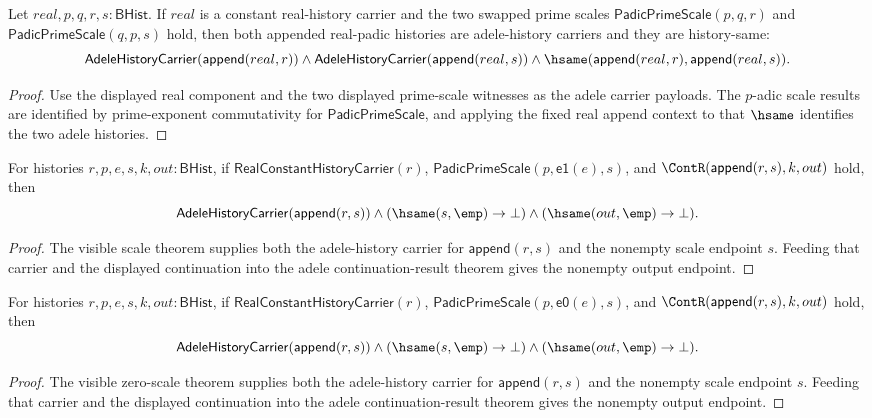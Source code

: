 \begin{theorem}
\label{thm:adele-prime-swap-scale-readback}
Let \(real,p,q,r,s:\mathsf{BHist}\). If \(real\) is a constant real-history
carrier and the two swapped prime scales
\(\mathsf{PadicPrimeScale}(p,q,r)\) and \(\mathsf{PadicPrimeScale}(q,p,s)\)
hold, then both appended real-padic histories are adele-history carriers and
they are history-same:
$$
\mathsf{AdeleHistoryCarrier}(\mathsf{append}(real,r))\land
\mathsf{AdeleHistoryCarrier}(\mathsf{append}(real,s))\land
\hsame(\mathsf{append}(real,r),\mathsf{append}(real,s)).
$$
\end{theorem}
\begin{proof}
Use the displayed real component and the two displayed prime-scale witnesses
as the adele carrier payloads. The \(p\)-adic scale results are identified by
prime-exponent commutativity for \(\mathsf{PadicPrimeScale}\), and applying
the fixed real append context to that \(\hsame\) identifies the two adele
histories.
\end{proof}

\begin{theorem}
\label{thm:adele-history-carrier-visible-scale-cont-nonempty-package}
For histories $r,p,e,s,k,out:\mathsf{BHist}$, if
$\mathsf{RealConstantHistoryCarrier}(r)$,
$\mathsf{PadicPrimeScale}(p,\mathsf{e1}(e),s)$, and
$\ContR(\mathsf{append}(r,s),k,out)$ hold, then
$$
\mathsf{AdeleHistoryCarrier}(\mathsf{append}(r,s))\land
(\hsame(s,\emp)\to\bot)\land(\hsame(out,\emp)\to\bot).
$$
\end{theorem}
\begin{proof}
The visible scale theorem supplies both the adele-history carrier for
$\mathsf{append}(r,s)$ and the nonempty scale endpoint $s$. Feeding that carrier
and the displayed continuation into the adele continuation-result theorem gives
the nonempty output endpoint.
\end{proof}

\begin{theorem}
\label{thm:adele-history-carrier-visible-zero-scale-cont-nonempty-package}
For histories $r,p,e,s,k,out:\mathsf{BHist}$, if
$\mathsf{RealConstantHistoryCarrier}(r)$,
$\mathsf{PadicPrimeScale}(p,\mathsf{e0}(e),s)$, and
$\ContR(\mathsf{append}(r,s),k,out)$ hold, then
$$
\mathsf{AdeleHistoryCarrier}(\mathsf{append}(r,s))\land
(\hsame(s,\emp)\to\bot)\land(\hsame(out,\emp)\to\bot).
$$
\end{theorem}
\begin{proof}
The visible zero-scale theorem supplies both the adele-history carrier for
$\mathsf{append}(r,s)$ and the nonempty scale endpoint $s$. Feeding that carrier
and the displayed continuation into the adele continuation-result theorem gives
the nonempty output endpoint.
\end{proof}

